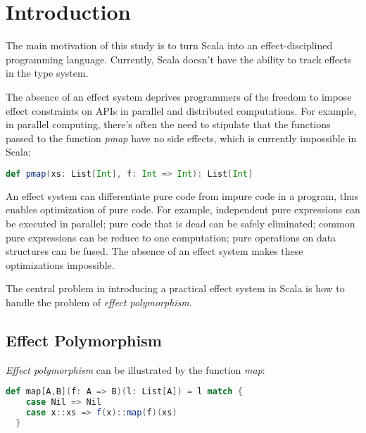 \section{Introduction}




The main motivation of this study is to turn Scala into an
effect-disciplined programming language. Currently, Scala doesn't have
the ability to track effects in the type system.

The absence of an effect system deprives programmers of the freedom to
impose effect constraints on APIs in parallel and distributed
computations. For example, in parallel computing, there's often the
need to stipulate that the functions passed to the function
\emph{pmap} have no side effects, which is currently impossible in
Scala:

\begin{lstlisting}[language=Scala]
def pmap(xs: List[Int], f: Int => Int): List[Int]
\end{lstlisting}

An effect system can differentiate pure code from impure code in a
program, thus enables optimization of pure code. For example,
independent pure expressions can be executed in parallel; pure code
that is dead can be safely eliminated; common pure expressions can be
reduce to one computation; pure operations on data structures can be
fused\cite{coutts2007stream}. The absence of an effect system makes
these optimizations impossible.

The central problem in introducing a practical effect system in Scala
is how to handle the problem of \emph{effect polymorphism}.

\subsection{Effect Polymorphism}

\emph{Effect polymorphism} can be illustrated by the
function \emph{map}:

\begin{lstlisting}[language=Scala]
  def map[A,B](f: A => B)(l: List[A]) = l match {
    case Nil => Nil
    case x::xs => f(x)::map(f)(xs)
  }
\end{lstlisting}

